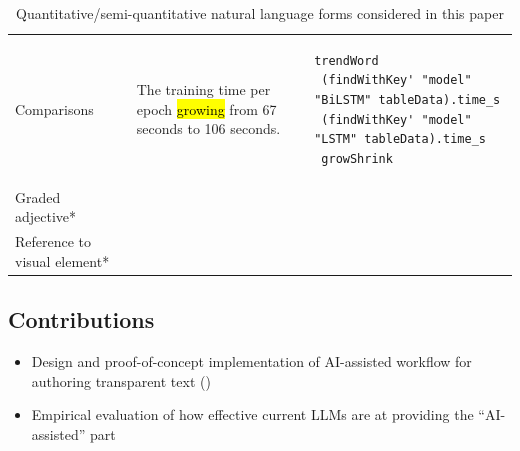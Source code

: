 \begin{table}[!ht]
\begin{tabular}{>{\raggedright\arraybackslash}p{2cm} >{\raggedright\arraybackslash}p{5cm} >{\raggedright\arraybackslash}p{6cm}}
        Comparisons
        & The training time per epoch \hl{growing} from 67 seconds to 106 seconds. &
        \vspace{-5pt}
        \begin{lstlisting}[language=Fluid,numbers=none]
trendWord
 (findWithKey' "model" "BiLSTM" tableData).time_s
 (findWithKey' "model" "LSTM" tableData).time_s
 growShrink
        \end{lstlisting} \\
        Graded adjective*            & ~                & ~                             \\
        Reference to visual element*                            & ~                & ~                             \\
        \bottomrule
    \end{tabular}
    \caption{Quantitative/semi-quantitative natural language forms considered in this paper}
    \label{tab:fluid_examples}
    \renewcommand{\arraystretch}{1.0}
\end{table}
\subsection{Contributions}

\begin{itemize}
    \item Design and proof-of-concept implementation of AI-assisted workflow for authoring transparent text
    ()
    \item Empirical evaluation of how effective current LLMs are at providing the ``AI-assisted'' part
\end{itemize}
